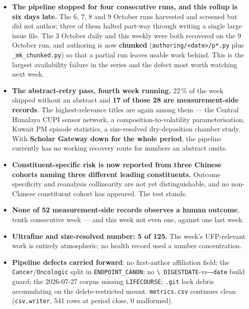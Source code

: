 \documentclass[10pt]{article}
\begin{document}
\footnotesize
\begin{itemize}
\item \textbf{The pipeline stopped for four consecutive runs, and this rollup is six days late.} The
6, 7, 8 and 9 October runs harvested and screened but did not author; three of them halted part-way
through writing a single large issue file. The 3 October daily and this weekly were both recovered on
the 9 October run, and authoring is now \textbf{chunked} (\texttt{authoring/<date>/p*.py} plus
\texttt{\_mk\_chunked.py}) so that a partial run leaves usable work behind. This is the largest
availability failure in the series and the defect most worth watching next week.

\item \textbf{The abstract-retry pass, fourth week running.} 22\,\% of the week shipped without an
abstract and \textbf{17 of those 28 are measurement-side records}. The highest-relevance titles are
again among them --- the Central Himalaya CUPI sensor network, a composition-to-volatility
parameterisation, Kuwait PM episode statistics, a size-resolved dry-deposition chamber study. With
\textbf{Scholar Gateway down for the whole period}, the pipeline currently has no working recovery route
for numbers an abstract omits.

\item \textbf{Constituent-specific risk is now reported from three Chinese cohorts naming three
different leading constituents.} Outcome specificity and reanalysis collinearity are not yet
distinguishable, and no non-Chinese constituent cohort has appeared. The test stands.

\item \textbf{None of 52 measurement-side records observes a human outcome}, tenth consecutive week ---
and this week not even one, against one last week.

\item \textbf{Ultrafine and size-resolved number: 5 of 125.} The week's UFP-relevant work is entirely
atmospheric; no health record used a number concentration.

\item \textbf{Pipeline defects carried forward}: no first-author affiliation field; the
\texttt{Cancer}/\texttt{Oncologic} split in \texttt{ENDPOINT\_CANON}; no \texttt{\textbackslash
DIGESTDATE}-vs-\texttt{--date} build guard; the 2026-07-27 corpus missing \texttt{LIFECOURSE};
\texttt{.git} lock debris accumulating on the delete-restricted mount.
\texttt{metrics.csv} continues clean (\texttt{csv.writer}, 541 rows at period close, 0 malformed).
\end{itemize}
\end{document}
